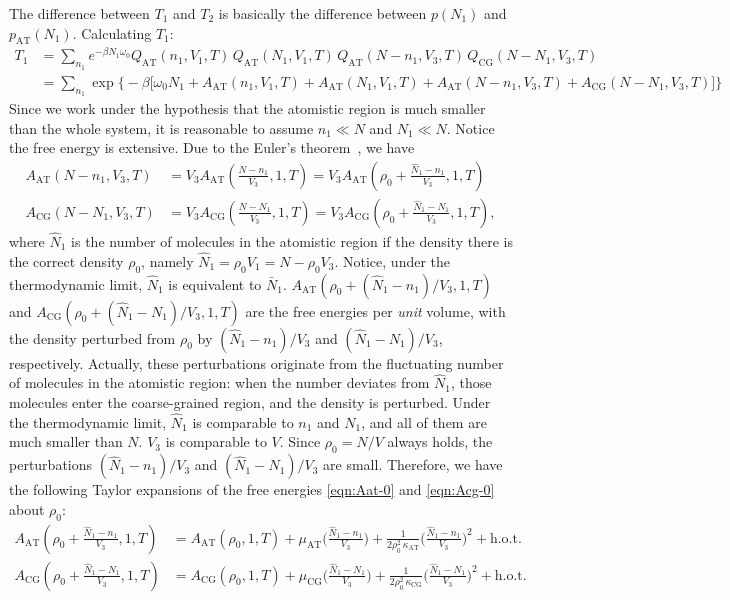 \documentclass[aip,jcp,a4paper,reprint,onecolumn]{revtex4-1}
\newcommand{\AT}{{\textrm{{AT}}}}
\newcommand{\CG}{{\textrm{CG}}}
\begin{document}
The difference between $T_1$ and $T_2$ is basically the difference
between $p(N_1)$ and $p_{\AT}(N_1)$.
Calculating $T_1$:
\begin{align}\nonumber
  T_1
  &=
  \sum_{n_1}
  e^{-\beta N_1\omega_0}
  Q_{\AT}(n_1,V_1,T)\,
  Q_{\AT}(N_1,V_1,T)\,
  Q_{\AT}(N-n_1,V_3,T)\,
  Q_{\CG}(N-N_1,V_3,T) \\\label{eqn:t1-1}
  &=
  \sum_{n_1}
  \exp
  \big\{-\beta
  \big[
  \omega_0N_1 +
  A_{\AT}(n_1,V_1,T) +
  A_{\AT}(N_1,V_1,T) +
  A_{\AT}(N-n_1,V_3,T) +
  A_{\CG}(N-N_1,V_3,T)
  \big]
  \big\}
\end{align}
Since we work under the hypothesis that the atomistic region is much smaller than the whole system, it
is reasonable to assume $n_1 \ll N$ and $N_1\ll N$.
Notice the free energy is extensive.
Due to the Euler's theorem~\cite{tuckeman2010statistical},
we have
\begin{align}\label{eqn:Aat-0}
  A_{\AT}(N-n_1,V_3,T)
  &= V_3 A_{\AT}(\frac{N-n_1}{V_3},1,T)
  = V_3 A_{\AT}(\rho_0 + \frac{\hat N_1 - n_1}{V_3},1,T)\\\label{eqn:Acg-0}
  A_{\CG}(N-N_1,V_3,T)
  &= V_3 A_{\CG}(\frac{N-N_1}{V_3},1,T)
  = V_3 A_{\CG}(\rho_0 + \frac{\hat N_1 - N_1}{V_3},1,T),
\end{align}
where $\hat N_1$ is the number of molecules in the atomistic region
if the density there is the correct density $\rho_0$, namely
$\hat N_1 = \rho_0V_1 = N - \rho_0 V_3$.
Notice, under the thermodynamic limit, $\hat N_1$ is equivalent to
$\bar N_1$.
$A_{\AT}(\rho_0 + (\hat N_1 - n_1)/{V_3},1,T)$ and
$A_{\CG}(\rho_0 + (\hat N_1 - N_1)/{V_3},1,T)$ are
the free energies per \emph{unit} volume, with
the density perturbed from $\rho_0$ by  $(\hat N_1 - n_1)/{V_3}$
and $(\hat N_1 - N_1)/{V_3}$, respectively.
Actually, these perturbations originate from the fluctuating
number of molecules in the atomistic region: when the number
deviates from $\hat N_1$, those molecules enter the coarse-grained
region, and the density is perturbed.
Under the thermodynamic
limit, $\hat N_1$ is comparable to $n_1$ and $N_1$, and all of them are
much smaller than $N$. $V_3$ is comparable to $V$.
Since $\rho_0 = N/V$ always holds, the perturbations
$(\hat N_1 - n_1)/{V_3}$
and $(\hat N_1 - N_1)/{V_3}$ are small.
Therefore, we have the following
Taylor expansions of the free energies \eqref{eqn:Aat-0} and \eqref{eqn:Acg-0}
about $\rho_0$:
\begin{align}
  A_{\AT}(\rho_0 + \frac{\hat N_1 - n_1}{V_3},1,T)
  &= A_{\AT}(\rho_0,1,T)
  +\mu_{\AT}
  \Big(
  \frac{\hat N_1 - n_1}{V_3}
  \Big)
  +
  \frac1{2\rho_0^2\,\kappa_{\AT}}
  \Big(
  \frac{\hat N_1 - n_1}{V_3}
  \Big)^2
  + \textrm{h.o.t.} \\
  A_{\CG}(\rho_0 + \frac{\hat N_1 - N_1}{V_3},1,T)
  &= A_{\CG}(\rho_0,1,T)
  +\mu_{\CG}
  \Big(
  \frac{\hat N_1 - N_1}{V_3}
  \Big)
  +
  \frac1{2\rho_0^2\,\kappa_{\CG}}
  \Big(
  \frac{\hat N_1 - N_1}{V_3}
  \Big)^2
  + \textrm{h.o.t.} 
\end{align}
\end{document}
